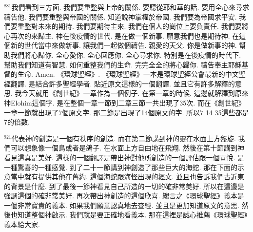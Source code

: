 \documentclass{book}
\begin{document}
$^{881}$我們看到三方面.
我們要重整與上帝的關係.
要聽從耶和華的話.
要用全心來尋求禱告他.
我們要重整與帝國的關係.
知道說神掌權於帝國.
我們要為帝國求平安.
我們要重整對未來的期待.
我們要期待主來.
我們在個人的崗位上要負責任.
我們要將心再次的來歸主.
神在後疫情的世代.
是在做一個新事.
願意我們也是期待神.
在這個新的世代當中來做新事.
讓我們一起做個禱告.
親愛的天父.
你是做新事的神.
幫助我們將心歸你.
全心愛你.
全心回應你.
全心尋求你.
特別是在後疫情的時代下.
幫助我們知道有智慧.
如何重整我們的生命.
完完全全的將心歸你.
禱告奉主耶穌基督的生命.
Amen.
《環球聖經》.
《環球聖經》一本是環球聖經公會最新的中文聖經翻譯.
是結合許多聖經學者.
貼近原文這樣的一個翻譯.
並且它有許多解釋的意思.
我今天就用《創世紀》一章作為一個例子.
在第一章的時候.
這邊就解釋到原來神Elohim這個字.
是在整個一章一節到二章三節一共出現了35次.
而在《創世紀》一章一節就出現了7個原文字.
那二節是出現了14個原文的字.
所以7 14 35這些都是7的倍數.

$^{921}$代表神的創造是一個有秩序的創造.
而在第二節講到神的靈在水面上方盤旋.
我們可以想象像一個鳥或者是鴿子.
在水面上方自由地在飛翔.
然後在第十節講到神看見這真是美好.
這樣的一個翻譯是帶出神對他所創造的一個評估跟一個喜悅.
是一種驚喜的一種感覺.
到了二十一節講到神創造了那些巨大的海蛇.
那在下面的示意當中就有提供其他在舊約.
這個海蛇跟海怪出現的經文.
並且也告訴我們古近東的背景是什麼.
到了最後一節神看見自己所造的一切的確非常美好.
所以在這邊是強調這個的確非常美好.
再次帶出神創造的這個欣喜.
總言之《環球聖經》義本是一個非常寶貴的義本.
如果我們願意認真地去查經.
並且是更加知道原文的意思.
然後也知道整個神啟示.
我們就是要正確地看義本.
那在這裡是誠心推薦《環球聖經》義本給大家.
\newpage
\end{document}
